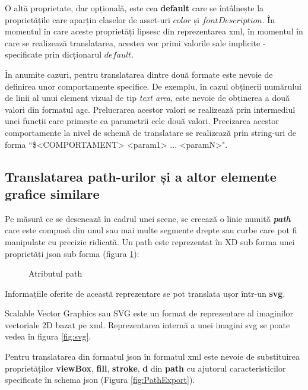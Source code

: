  O altă proprietate, dar opțională, este cea \textbf{default} care se întâlnește la proprietățile care aparțin claselor de asset-uri $color$ și $fontDescription$. În momentul în care aceste proprietăți lipsesc din reprezentarea xml, în momentul în care se realizează translatarea, acestea vor primi valorile sale implicite - specificate prin dicționarul $default$.

 În anumite cazuri, pentru translatarea dintre două formate este nevoie de definirea unor comportamente specifice. De exemplu, în cazul obținerii numărului de linii al unui element vizual de tip \textit{text area}, este nevoie de obținerea a două valori din formatul agc. Prelucrarea acestor valori se realizează prin intermediul unei funcții care primește ca parametrii cele două valori. 
 Precizarea acestor comportamente la nivel de schemă de translatare se realizează prin string-uri de forma ``\$<COMPORTAMENT> <param1> ... <paramN>".

\subsection{Translatarea path-urilor și a altor elemente grafice similare}

Pe măsură ce se desenează în cadrul unei scene, se creează o linie numită \textbf{\textit{path}} care este compusă din unul sau mai multe segmente drepte sau curbe care pot fi manipulate cu precizie ridicată. Un path este reprezentat în XD sub forma unei proprietăți json sub forma (figura \ref{fig:path}):

\begin{figure}[!htbp]
\caption{Atributul path}\label{fig:path}
\end{figure}

Informațiile oferite de această reprezentare se pot translata ușor într-un \textbf{svg}. 

Scalable Vector Graphics sau SVG este un format de reprezentare al imaginilor vectoriale 2D bazat pe xml. Reprezentarea internă a unei imagini svg se poate vedea în figura \ref{fig:svg}.

Pentru translatarea din formatul json în formatul xml este nevoie de substituirea proprietăților \textbf{viewBox}, \textbf{fill}, \textbf{stroke}, \textbf{d} din \textbf{path} cu ajutorul caracteristicilor specificate în schema json (Figura \ref{fig:PathExport}).


